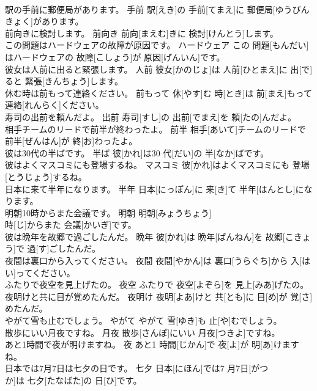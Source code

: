 \documentclass[8pt]{extreport}
\begin{document}
\begin{CJK}{UTF8}{min}
\\	駅の手前に郵便局があります。	手前	駅[えき]の 手前[てまえ]に 郵便局[ゆうびんきょく]があります。	
\\	前向きに検討します。	前向き	前向[まえむ]きに 検討[けんとう]します。	
\\	この問題はハードウェアの故障が原因です。	ハードウェア	この 問題[もんだい]はハードウェアの 故障[こしょう]が 原因[げんいん]です。	
\\	彼女は人前に出ると緊張します。	人前	彼女[かのじょ]は 人前[ひとまえ]に 出[で]ると 緊張[きんちょう]します。	
\\	休む時は前もって連絡ください。	前もって	休[やす]む 時[とき]は 前[まえ]もって 連絡[れんらく]ください。	
\\	寿司の出前を頼んだよ。	出前	寿司[すし]の 出前[でまえ]を 頼[たの]んだよ。	
\\	相手チームのリードで前半が終わったよ。	前半	相手[あいて]チームのリードで 前半[ぜんはん]が 終[お]わったよ。	
\\	彼は30代の半ばです。	半ば	彼[かれ]は30 代[だい]の 半[なか]ばです。	
\\	彼はよくマスコミにも登場するね。	マスコミ	彼[かれ]はよくマスコミにも 登場[とうじょう]するね。	
\\	日本に来て半年になります。	半年	日本[にっぽん]に 来[き]て 半年[はんとし]になります。	
\\	明朝10時からまた会議です。	明朝	明朝[みょうちょう] 
\\	時[じ]からまた 会議[かいぎ]です。	
\\	彼は晩年を故郷で過ごしたんだ。	晩年	彼[かれ]は 晩年[ばんねん]を 故郷[こきょう]で 過[す]ごしたんだ。	
\\	夜間は裏口から入ってください。	夜間	夜間[やかん]は 裏口[うらぐち]から 入[はい]ってください。	
\\	ふたりで夜空を見上げたの。	夜空	ふたりで 夜空[よぞら]を 見上[みあ]げたの。	
\\	夜明けと共に目が覚めたんだ。	夜明け	夜明[よあ]けと 共[とも]に 目[め]が 覚[さ]めたんだ。	
\\	やがて雪も止むでしょう。	やがて	やがて 雪[ゆき]も 止[や]むでしょう。	
\\	散歩にいい月夜ですね。	月夜	散歩[さんぽ]にいい 月夜[つきよ]ですね。	
\\	あと1時間で夜が明けますね。	夜	あと1 時間[じかん]で 夜[よ]が 明[あ]けますね。	
\\	日本では7月7日は七夕の日です。	七夕	日本[にほん]では7 月7日[がつ 
\\	か]は 七夕[たなばた]の 日[ひ]です。	

\end{CJK}
\end{document}
